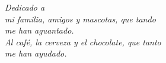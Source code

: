 
\thispagestyle{empty}
\begin{flushright}
	\textit{Dedicado a \\
		mi familia, amigos y mascotas, que tando \\
		me han aguantado.\\
		Al café, la cerveza y el chocolate, que tanto\\
		me han ayudado.}
\end{flushright}
\afterpage{\null\newpage}
\pagestyle{empty}
